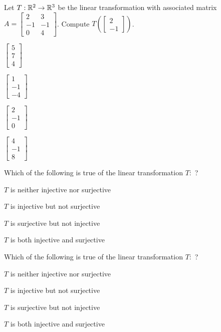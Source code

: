 \documentclass{article}
\begin{document}
\begin{readinessAssuranceTest}
\item Let $T: \mathbb{R}^2 \rightarrow \mathbb{R}^3$ be the linear transformation with associated matrix $A=\begin{bmatrix} 2 & 3 \\ -1 & -1 \\ 0 & 4 \end{bmatrix}$.  Compute $T\left(\begin{bmatrix} 2 \\ -1 \end{bmatrix}\right)$.
\begin{multicols}{4}
\begin{readinessAssuranceTestChoices}
\item $\begin{bmatrix} 5 \\ 7 \\ 4\end{bmatrix}$
\item $\begin{bmatrix} 1 \\ -1 \\ -4 \end{bmatrix}$
\item $\begin{bmatrix} 2 \\ -1 \\ 0 \end{bmatrix}$
\item $\begin{bmatrix} 4 \\ -1 \\ 8 \end{bmatrix}$
\end{readinessAssuranceTestChoices}
\end{multicols}

\item Which of the following is true of the linear transformation $T:$ ?
\begin{readinessAssuranceTestChoices}
\item $T$ is neither injective nor surjective
\item $T$ is injective but not surjective
\item $T$ is surjective but not injective
\item $T$ is both injective and surjective
\end{readinessAssuranceTestChoices}

\item Which of the following is true of the linear transformation $T:$ ?
\begin{readinessAssuranceTestChoices}
\item $T$ is neither injective nor surjective
\item $T$ is injective but not surjective
\item $T$ is surjective but not injective
\item $T$ is both injective and surjective
\end{readinessAssuranceTestChoices}


\end{readinessAssuranceTest}
\end{document}

